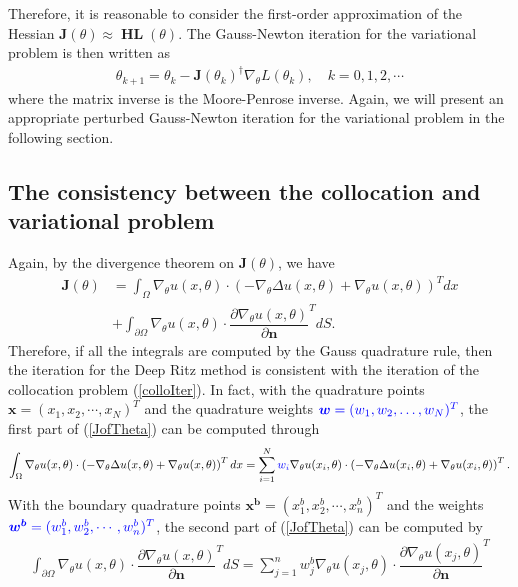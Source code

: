\documentclass[a4paper, 11pt]{article}
\numberwithin{equation}{section}
\begin{document}
Therefore, it is reasonable to consider the first-order approximation of the Hessian $\boldsymbol{J}(\theta) \approx \boldsymbol{\operatorname{HL}}(\theta)$. The Gauss-Newton iteration for the variational problem is then written as
\begin{align}\label{varIter}
\theta_{k+1} = \theta_k - \boldsymbol{J} (\theta_k)^{\dagger}  \nabla_{\theta}L(\theta_k), \quad k=0,1,2,\cdots
\end{align}
where the matrix inverse is the Moore-Penrose inverse. Again, we will present an appropriate perturbed Gauss-Newton iteration for the variational problem in the following section.

\subsection{The consistency between the collocation and variational problem}
\quad\quad Again, by the divergence theorem on $ \boldsymbol{J}(\theta)$, we have
\begin{align}\label{JofTheta}
 \boldsymbol{J}(\theta) &= \int_{\Omega} \nabla_{\theta} u(x,\theta) \cdot \left( -\nabla_{\theta} \Delta u(x,\theta) + \nabla_{\theta} u(x,\theta) \right)^{T}  dx \nonumber \\
& + \int_{\partial \Omega} \nabla_{\theta} u(x,\theta) \cdot \dfrac{\partial  \nabla_{\theta} u(x,\theta)}{\partial \boldsymbol{n}}^{T}dS.
\end{align}
Therefore, if all the integrals are computed by the Gauss quadrature rule, then the iteration for the Deep Ritz method is consistent with the  iteration of the collocation problem (\ref{colloIter}). In fact, with the quadrature points $\boldsymbol{x} = (x_1, x_2, \cdots,  x_N)^{T}$ and the quadrature weights ${\color{blue} \boldsymbol{w} = (w_1,w_2,\dots,w_N)^{T}}$, 
the first part of (\ref{JofTheta}) can be computed through 
\begin{align}
 \int_{\Omega}  \nabla_{\theta} u(x,\theta) \cdot \left( -\nabla_{\theta} \Delta u(x,\theta) + \nabla_{\theta} u(x,\theta) \right)^{T} dx = \sum_{i=1}^{N}{\color{blue}w_i}\nabla_{\theta} u(x_i,\theta) \cdot \left( -\nabla_{\theta} \Delta u(x_i,\theta) + \nabla_{\theta} u(x_i,\theta) \right)^{T}.
\end{align}
With the boundary quadrature points $\boldsymbol{x^b} = (x^b_1, x^b_2, \cdots,  x^b_n)^{T}$ and the weights ${\color{blue} \boldsymbol{w^b} = (w^b_1, w^b_2, \cdots, w^b_n)^{T}}$, the second part of (\ref{JofTheta}) can be computed by
\begin{align}
 \int_{\partial \Omega}   \nabla_{\theta} u(x,\theta) \cdot \dfrac{\partial  \nabla_{\theta} u(x,\theta)}{\partial \boldsymbol{n}}^{T} dS  = \sum_{j=1}^{n} w^b_j \nabla_{\theta} u(x_j,\theta) \cdot \dfrac{\partial  \nabla_{\theta} u(x_j,\theta)}{\partial \boldsymbol{n}}^{T} 
\end{align}
\end{document}
